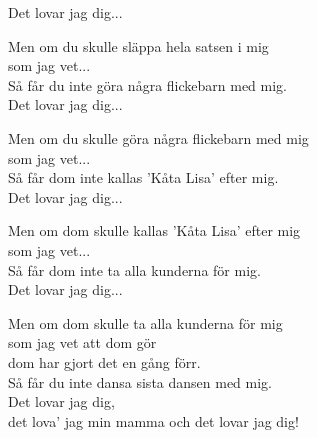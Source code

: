 Det lovar jag dig...\par
\vspace{10pt}
Men om du skulle släppa hela satsen i mig\\
som jag vet...\\
Så får du inte göra några flickebarn med mig.\\
Det lovar jag dig...\par
\vspace{10pt}
Men om du skulle göra några flickebarn med mig\\
som jag vet...\\
Så får dom inte kallas 'Kåta Lisa' efter mig.\\
Det lovar jag dig...\par
\vspace{10pt}
Men om dom skulle kallas 'Kåta Lisa' efter mig\\
som jag vet...\\
Så får dom inte ta alla kunderna för mig.\\
Det lovar jag dig...\par
\vspace{10pt}
Men om dom skulle ta alla kunderna för mig\\
som jag vet att dom gör\\
dom har gjort det en gång förr.\\
Så får du inte dansa sista dansen med mig.\\
Det lovar jag dig,\\
det lova' jag min mamma och det lovar jag dig!
